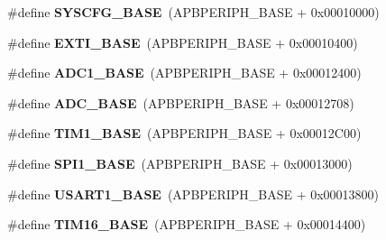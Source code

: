 \begin{DoxyCompactItemize}
\item 
\mbox{\label{group___peripheral__memory__map_ga62246020bf3b34b6a4d8d0e84ec79d3d}} 
\#define {\bfseries S\+Y\+S\+C\+F\+G\+\_\+\+B\+A\+SE}~(A\+P\+B\+P\+E\+R\+I\+P\+H\+\_\+\+B\+A\+SE + 0x00010000)
\item 
\mbox{\label{group___peripheral__memory__map_ga87371508b3bcdcd98cd1ec629be29061}} 
\#define {\bfseries E\+X\+T\+I\+\_\+\+B\+A\+SE}~(A\+P\+B\+P\+E\+R\+I\+P\+H\+\_\+\+B\+A\+SE + 0x00010400)
\item 
\mbox{\label{group___peripheral__memory__map_ga695c9a2f892363a1c942405c8d351b91}} 
\#define {\bfseries A\+D\+C1\+\_\+\+B\+A\+SE}~(A\+P\+B\+P\+E\+R\+I\+P\+H\+\_\+\+B\+A\+SE + 0x00012400)
\item 
\mbox{\label{group___peripheral__memory__map_gad06cb9e5985bd216a376f26f22303cd6}} 
\#define {\bfseries A\+D\+C\+\_\+\+B\+A\+SE}~(A\+P\+B\+P\+E\+R\+I\+P\+H\+\_\+\+B\+A\+SE + 0x00012708)
\item 
\mbox{\label{group___peripheral__memory__map_gaf8aa324ca5011b8173ab16585ed7324a}} 
\#define {\bfseries T\+I\+M1\+\_\+\+B\+A\+SE}~(A\+P\+B\+P\+E\+R\+I\+P\+H\+\_\+\+B\+A\+SE + 0x00012\+C00)
\item 
\mbox{\label{group___peripheral__memory__map_ga50cd8b47929f18b05efbd0f41253bf8d}} 
\#define {\bfseries S\+P\+I1\+\_\+\+B\+A\+SE}~(A\+P\+B\+P\+E\+R\+I\+P\+H\+\_\+\+B\+A\+SE + 0x00013000)
\item 
\mbox{\label{group___peripheral__memory__map_ga86162ab3f740db9026c1320d46938b4d}} 
\#define {\bfseries U\+S\+A\+R\+T1\+\_\+\+B\+A\+SE}~(A\+P\+B\+P\+E\+R\+I\+P\+H\+\_\+\+B\+A\+SE + 0x00013800)
\item 
\mbox{\label{group___peripheral__memory__map_ga16c97093a531d763b0794c3e6d09e1bf}} 
\#define {\bfseries T\+I\+M16\+\_\+\+B\+A\+SE}~(A\+P\+B\+P\+E\+R\+I\+P\+H\+\_\+\+B\+A\+SE + 0x00014400)
\item 
\mbox{\label{group___peripheral__memory__map_gaffbedbe30e8c4cffdea326d6c1800574}} 

\end{DoxyCompactItemize}
